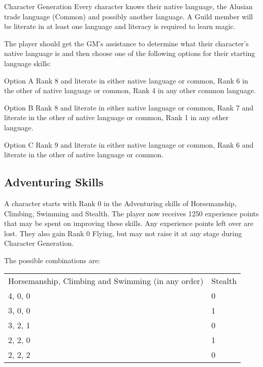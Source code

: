 \begin{Chapter}{Character Generation}
Every character knows their native language, the Alusian trade
language (Common) and possibly another language. A Guild member will
be literate in at least one language and literacy is required to learn
magic.

The player should get the GM’s assistance to determine what their
character’s native language is and then choose one of the following
options for their starting language skills:

\begin{Description}

\item[Option A] Rank 8 and literate in either native language or
  common, Rank 6 in the other of native language or common, Rank 4 in
  any other common language.

\item[Option B] Rank 8 and literate in either native language or
  common, Rank 7 and literate in the other of native language or
  common, Rank 1 in any other language.

\item[Option C] Rank 9 and literate in either native language or
  common, Rank 6 and literate in the other of native language or
  common.

\end{Description}
  
\subsection{Adventuring Skills}

A character starts with Rank 0 in the Adventuring skills of
Horsemanship, Climbing, Swimming and Stealth.  The player now receives
1250 experience points that may be spent on improving these skills.
Any experience points left over are lost. They also gain Rank 0
Flying, but may not raise it at any stage during Character Generation.

The possible combinations are: 

\begin{tabularx}{\columnwidth}{XX}
Horsemanship, Climbing and Swimming (in any order)	& Stealth \\
4, 0, 0							& 0 \\
3, 0, 0							& 1 \\
3, 2, 1							& 0 \\
2, 2, 0							& 1 \\
2, 2, 2							& 0 \\
\end{tabularx}


\end{Chapter}
